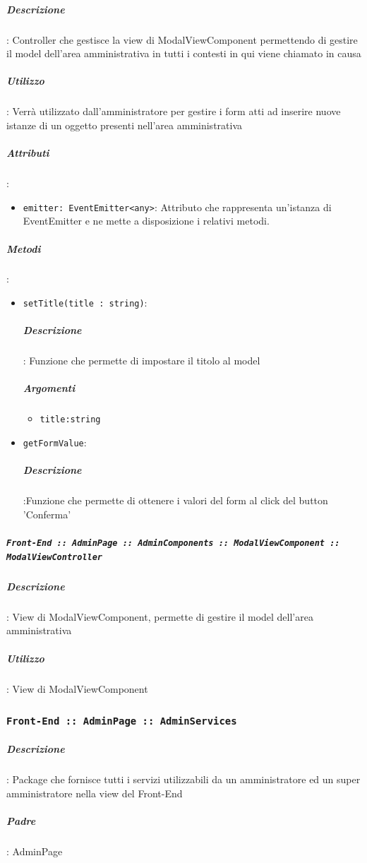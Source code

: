 \documentclass[../DefinizioneDiProdotto_v2.0.0.tex]{subfiles}
\begin{document}
					\subparagraph{Descrizione}: Controller che gestisce la view di ModalViewComponent permettendo di gestire il model dell'area amministrativa in tutti i contesti in qui viene chiamato in causa
					\subparagraph{Utilizzo}: Verrà utilizzato dall'amministratore per gestire i form atti ad inserire nuove istanze di un oggetto presenti nell'area amministrativa
					\subparagraph{Attributi}:
					      \begin{itemize}
			      	      	\item \texttt{emitter: EventEmitter<any>}: Attributo che rappresenta un'istanza di EventEmitter e ne mette a disposizione i relativi metodi.
			      	      \end{itemize}
					\subparagraph{Metodi}:
					      \begin{itemize}
			      	      	\item \texttt{setTitle(title : string)}:

							\subparagraph{Descrizione}: Funzione che permette di impostare il titolo al model
							\subparagraph{Argomenti}
							\begin{itemize}
								\item	\texttt{title:string}
							\end{itemize}
			      	      	\item \texttt{getFormValue}:
							\subparagraph{Descrizione}:Funzione che permette di ottenere i valori del form al click del button 'Conferma'
			      	      \end{itemize}\vspace{0.5em}

				\subparagraph{\texttt{Front-End :: AdminPage :: AdminComponents :: ModalViewComponent :: ModalViewController}}
					\subparagraph{Descrizione}: View di ModalViewComponent, permette di gestire il model dell'area amministrativa
					\subparagraph{Utilizzo}: View di ModalViewComponent


	\newpage
	\subsubsection{\texttt{Front-End :: AdminPage :: AdminServices}}

			\subparagraph{Descrizione}: Package che fornisce tutti i servizi utilizzabili da un amministratore ed un super amministratore nella view del Front-End
			\subparagraph{Padre}: AdminPage
\end{document}
